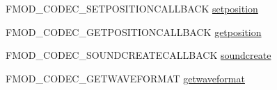 \begin{DoxyCompactItemize}
\item 
F\-M\-O\-D\-\_\-\-C\-O\-D\-E\-C\-\_\-\-S\-E\-T\-P\-O\-S\-I\-T\-I\-O\-N\-C\-A\-L\-L\-B\-A\-C\-K \hyperlink{struct_f_m_o_d___c_o_d_e_c___d_e_s_c_r_i_p_t_i_o_n_a7d60d107fe48efef977f2a883fd097be}{setposition}
\item 
F\-M\-O\-D\-\_\-\-C\-O\-D\-E\-C\-\_\-\-G\-E\-T\-P\-O\-S\-I\-T\-I\-O\-N\-C\-A\-L\-L\-B\-A\-C\-K \hyperlink{struct_f_m_o_d___c_o_d_e_c___d_e_s_c_r_i_p_t_i_o_n_a3e532db698aa1f571ddb4afb20f53682}{getposition}
\item 
F\-M\-O\-D\-\_\-\-C\-O\-D\-E\-C\-\_\-\-S\-O\-U\-N\-D\-C\-R\-E\-A\-T\-E\-C\-A\-L\-L\-B\-A\-C\-K \hyperlink{struct_f_m_o_d___c_o_d_e_c___d_e_s_c_r_i_p_t_i_o_n_a9004a5424a76ae31edc173015a20233e}{soundcreate}
\item 
F\-M\-O\-D\-\_\-\-C\-O\-D\-E\-C\-\_\-\-G\-E\-T\-W\-A\-V\-E\-F\-O\-R\-M\-A\-T \hyperlink{struct_f_m_o_d___c_o_d_e_c___d_e_s_c_r_i_p_t_i_o_n_a81c4079df89138532f9c435ebd0d1f64}{getwaveformat}
\end{DoxyCompactItemize}


